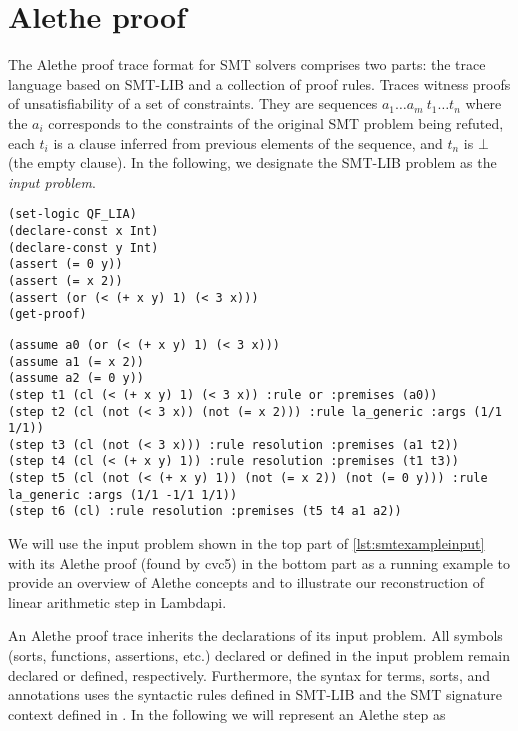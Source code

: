 \section{Alethe proof}
\label{sect:alethe}

The Alethe proof trace format \cite{alethespec} for SMT solvers comprises two parts: the trace language based on SMT-LIB and a collection of proof rules. Traces witness proofs of unsatisfiability of a set of constraints.
They are sequences $a_1 \dots a_m~t_1 \dots t_n$ where
the $a_i$ corresponds to the constraints of the original SMT problem being refuted, each $t_i$ is a clause inferred from previous elements of the sequence, and $t_n$ is $\bot$ (the empty clause).
In the following, we designate the SMT-LIB problem as the \emph{input problem}.

\begin{lstlisting}[language=SMT,label={lst:smtexampleinput}]
(set-logic QF_LIA)
(declare-const x Int)
(declare-const y Int)
(assert (= 0 y))
(assert (= x 2))
(assert (or (< (+ x y) 1) (< 3 x)))
(get-proof)
\end{lstlisting}

\begin{center}
\lightning
\end{center}

\begin{lstlisting}[language=SMT,caption={The following example is the proof for the unsatisfiability of $(x+y < 1) \lor (3<x), x = 2$ and $0 = y$.},label={lst:smtexampleproof}]
(assume a0 (or (< (+ x y) 1) (< 3 x)))
(assume a1 (= x 2))
(assume a2 (= 0 y))
(step t1 (cl (< (+ x y) 1) (< 3 x)) :rule or :premises (a0))
(step t2 (cl (not (< 3 x)) (not (= x 2))) :rule la_generic :args (1/1 1/1))
(step t3 (cl (not (< 3 x))) :rule resolution :premises (a1 t2))
(step t4 (cl (< (+ x y) 1)) :rule resolution :premises (t1 t3))
(step t5 (cl (not (< (+ x y) 1)) (not (= x 2)) (not (= 0 y))) :rule la_generic :args (1/1 -1/1 1/1))
(step t6 (cl) :rule resolution :premises (t5 t4 a1 a2))
\end{lstlisting}

We will use the input problem shown in the top part of \cref{lst:smtexampleinput} with its Alethe proof (found by cvc5) in the bottom part as a running example to provide an overview of Alethe concepts and to illustrate our reconstruction of linear arithmetic step in Lambdapi.

An Alethe proof trace inherits the declarations of its input problem. All symbols (sorts, functions, assertions, etc.) declared or defined in the input problem remain declared or defined, respectively. Furthermore, the syntax for terms, sorts, and annotations uses the syntactic rules defined in SMT-LIB \cite[\S 3]{smtlib} and the SMT signature context defined in \cite[\S 5.1 and \S 5.2]{smtlib}.
In the following we will represent an Alethe step as

